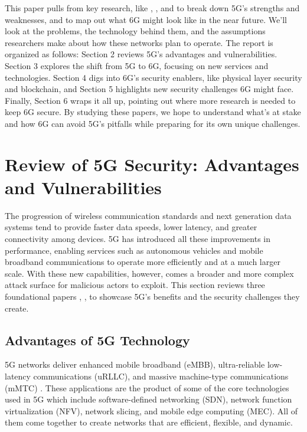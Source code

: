 \documentclass[acmtog]{acmart}
\begin{document}
This paper pulls from key research, like \cite{ref3}, \cite{ref6}, and \cite{ref7} to break down 5G’s strengths and weaknesses, and \cite{ref4} to map out what 6G might look like in the near future. We’ll look at the problems, the technology behind them, and the assumptions researchers make about how these networks plan to operate. The report is organized as follows: Section 2 reviews 5G’s advantages and vulnerabilities. Section 3 explores the shift from 5G to 6G, focusing on new services and technologies. Section 4 digs into 6G’s security enablers, like physical layer security and blockchain, and Section 5 highlights new security challenges 6G might face. Finally, Section 6 wraps it all up, pointing out where more research is needed to keep 6G secure. By studying these papers, we hope to understand what’s at stake and how 6G can avoid 5G’s pitfalls while preparing for its own unique challenges.

\section{Review of 5G Security: Advantages and Vulnerabilities}
The progression of wireless communication standards and next generation data systems tend to provide faster data speeds, lower latency, and greater connectivity among devices. 5G has introduced all these improvements in performance, enabling services such as autonomous vehicles and mobile broadband communications to operate more efficiently and at a much larger scale. With these new capabilities, however, comes a broader and more complex attack surface for malicious actors to exploit. This section reviews three foundational papers \cite{ref3}, \cite{ref6}, \cite{ref7} to showcase 5G's benefits and the security challenges they create.

\subsection{Advantages of 5G Technology}
5G networks deliver enhanced mobile broadband (eMBB), ultra-reliable low-latency communications (uRLLC), and massive machine-type communications (mMTC) \cite{ref6}. These applications are the product of some of the core technologies used in 5G which include software-defined networking (SDN), network function virtualization (NFV), network slicing, and mobile edge computing (MEC). All of them come together to create networks that are efficient, flexible, and dynamic. 
\end{document}
